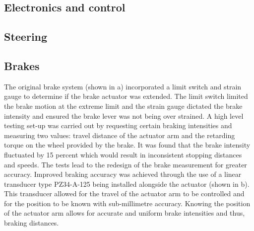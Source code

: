 \documentclass[main.tex]{subfiles}
\begin{document}
\subsection{Electronics and control}

\subsection{Steering}

\subsection{Brakes}
The original brake system (shown in  a) incorporated a limit switch and strain gauge to determine if the brake actuator was extended. The limit switch limited the brake motion at the extreme limit and the strain gauge dictated the brake intensity and ensured the brake lever was not being over strained. A high level testing set-up was carried out by requesting certain braking intensities and measuring two values: travel distance of the actuator arm and the retarding torque on the wheel provided by the brake. It was found that the brake intensity fluctuated by 15 percent which would result in inconsistent stopping distances and speeds. The tests lead to the redesign of the brake measurement for greater accuracy. Improved braking accuracy was achieved through the use of a linear transducer type PZ34-A-125 being installed alongside the actuator (shown in  b). This transducer allowed for the travel of the actuator arm to be controlled and for the position to be known with sub-millimetre accuracy. Knowing the position of the actuator arm allows for accurate and uniform brake intensities and thus, braking distances.
\end{document}
